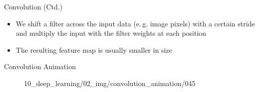 \begin{frame}{Convolution (Ctd.)}{}\important
	\begin{itemize}
		\item We shift a filter across the input data (e.\,g. image pixels) with a certain stride and multiply the input with the filter weights at each position
		\item The resulting feature map is usually smaller in size
	\end{itemize}
	
	\vspace*{8mm}
\end{frame}


\begin{frame}{Convolution Animation}{}\important
	\begin{figure}
		\centering
			{10_deep_learning/02_img/convolution_animation/}{0}{45}
	\end{figure}
\end{frame}


